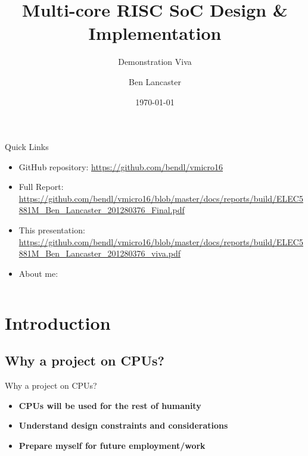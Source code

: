 \documentclass[aspectratio=169]{beamer}
\title
    [Main Project]
    {\textbf{Multi-core RISC SoC Design \& Implementation}}
\subtitle{Demonstration Viva}
\author
    [B. Lancaster]
    {Ben Lancaster}
\institute
    [\hypersetup{urlcolor=jdgrey}%
     \href{https://bendl.me/}{https://bendl.me}
    ]
    {201280376\\
    ELEC5881M - Main Project}
\date
    {\today}
\begin{document}
\begin{frame}[plain]
\titlepage
\end{frame}

\begin{frame}{Quick Links}
\begin{itemize}\setlength\itemsep{1em}
    \item GitHub repository: \url{https://github.com/bendl/vmicro16}
    \item Full Report: \url{https://github.com/bendl/vmicro16/blob/master/docs/reports/build/ELEC5881M_Ben_Lancaster_201280376_Final.pdf}
    \item This presentation: \url{https://github.com/bendl/vmicro16/blob/master/docs/reports/build/ELEC5881M_Ben_Lancaster_201280376_viva.pdf}
    \item About me: 
\end{itemize}
\end{frame}

\begin{frame}
\vspace{-1cm}
\begin{columns}[t]
        \begin{column}{.3\textwidth}
            \tableofcontents[sections={1-3},subsectionstyle=show/show/hide]
        \end{column}
        \begin{column}{.3\textwidth}
            \tableofcontents[sections={4-6},subsectionstyle=show/show/hide]
        \end{column}
    \end{columns}
\end{frame}

\section{Introduction}
\frame{\vspace{-1cm}\tableofcontents[currentsection, subsectionstyle=show/show/hide]}

\subsection{Why a project on CPUs?}
\begin{frame}{Why a project on CPUs?}
\begin{itemize}\setlength\itemsep{1em}
    \item{\textbf{CPUs will be used for the rest of humanity}}
    \item{\textbf{Understand design constraints and considerations}}
    \item{\textbf{Prepare myself for future employment/work}}
\end{itemize}
\end{frame}
\end{document}
